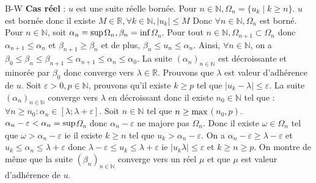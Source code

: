 \documentclass[12pt,a4paper]{report}
\begin{document}
\begin{demonstration}{B-W}
\textbf{Cas réel} : $u$ est une suite réelle bornée.
\newline \newline {}
\newline Pour $n \in \mathbb{N}, \Omega_n = \{u_k \mid k \geq n \}$. $u$ est bornée donc il existe $M \in \mathbb{R}, \forall k \in \mathbb{N}, \lvert u_k \rvert \leq  M$
\newline Donc $\forall n \in \mathbb{N}, \Omega_n$ est borné. Pour $n \in \mathbb{N}$, soit $\alpha_n = \rm{sup}$$\Omega_n, \beta_n = \rm{inf}$$\Omega_n$.
\newline Pour tout $n \in \mathbb{N}, \Omega_{n+1} \subset \Omega_n$ donc $\alpha_{n+1} \leq \alpha_n$ et $\beta_{n+1} \geq \beta_{n}$ et de plus, $\beta_n \leq u_n \leq \alpha_n$.
\newline Ainsi, $\forall n \in \mathbb{N}$, on a $\beta_0 \leq \beta_n \leq \beta_{n+1} \leq \alpha_{n+1} \leq \alpha_n \leq \alpha_0$.
\newline La suite $(\alpha_n)_{n \in \mathbb{N}}$ est décroissante et minorée par $\beta_0$ donc converge vers $\lambda \in \mathbb{R}$. Prouvons que $\lambda$ est valeur d'adhérence de $u$.
\newline Soit $\varepsilon > 0, p \in \mathbb{N}$, prouvons qu'il existe $k \geq p$ tel que $\lvert u_k - \lambda \rvert \leq \varepsilon$.
\newline La suite $(\alpha_n)_{n \in \mathbb{N}}$ converge vers $\lambda$ en décroissant donc il existe $n_0 \in \mathbb{N}$ tel que : $\forall n \geq n_0 : \alpha_n \in \left[\lambda; \lambda + \varepsilon \right]$.
\newline Soit $n \in \mathbb{N}$ tel que $n \geq \rm{max}$$(n_0,p)$.
\newline $\alpha_n - \varepsilon < \alpha_n = \rm{sup}$$\Omega_n$ donc $\alpha_n-\varepsilon$ ne majore pas $\Omega_n$. Donc il existe $\omega \in \Omega_n$ tel que $\omega > \alpha_n - \varepsilon$ ie il existe $k \geq n $ tel que $u_k > \alpha_n - \varepsilon$.
\newline On a $\alpha_n - \varepsilon \geq \lambda - \varepsilon$ et $u_k \leq \alpha_n \leq \lambda + \varepsilon$ donc $\lambda - \varepsilon \leq u_k \leq \lambda + \varepsilon$ ie $\lvert u_k \lambda \rvert \leq \varepsilon$ et $k \geq n \geq p$.
\newline On montre de même que la suite $(\beta_n)_{n \in \mathbb{N}}$ converge vers un réel $\mu$ et que $\mu$ est valeur d'adhérence de $u$.

\end{demonstration}
\end{document}

